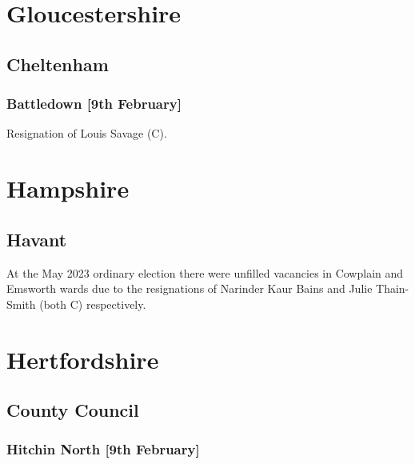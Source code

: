 \documentclass[a4paper,openany]{book}
\begin{document}
\begin{resultsiii}
\section{Gloucestershire}

\subsection*{Cheltenham}

\subsubsection*{Battledown \hspace*{\fill}\nolinebreak[1]%
	\enspace\hspace*{\fill}
	[9th February]}


Resignation of Louis Savage (C).

\section{Hampshire}

\subsection*{Havant}

At the May 2023 ordinary election there were unfilled vacancies in Cowplain and Emsworth wards due to the resignations of Narinder Kaur Bains and Julie Thain-Smith (both C) respectively.%
%
%

\section{Hertfordshire}

\subsection*{County Council}

\subsubsection*{Hitchin North \hspace*{\fill}\nolinebreak[1]%
	\enspace\hspace*{\fill}
	[9th February]}


\end{resultsiii}
\end{document}
